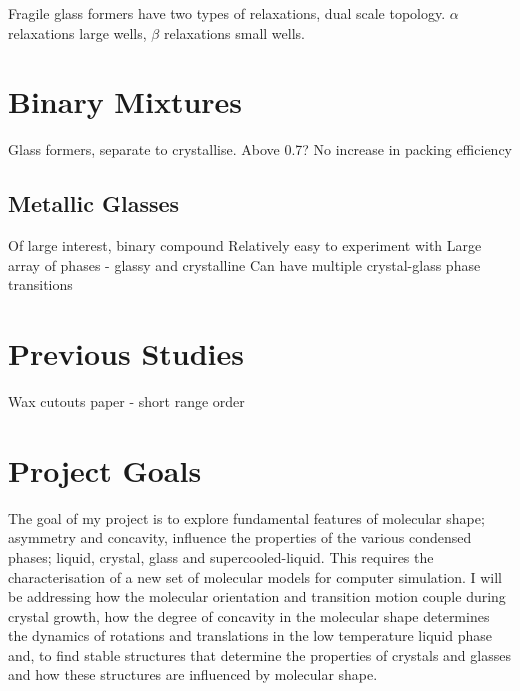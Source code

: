 \begin{figure}
\end{figure}

Fragile glass formers have two types of relaxations, dual scale topology. $\alpha$ relaxations large wells, $\beta$ relaxations small wells.~\cite{stillinger:95}

\section{Binary Mixtures}
Glass formers, separate to crystallise. Above 0.7? No increase in packing efficiency

\subsection{Metallic Glasses}
Of large interest, binary compound
Relatively easy to experiment with
Large array of phases - glassy and crystalline
Can have multiple crystal-glass phase transitions



\section{Previous Studies}
Wax cutouts paper - short range order

\section{Project Goals}

The goal of my project is to explore fundamental features of molecular shape; asymmetry and concavity, influence the properties of the various condensed phases; liquid, crystal, glass and supercooled-liquid. This requires the characterisation of a new set of molecular models for computer simulation. I will be addressing how the molecular orientation and transition motion couple during crystal growth, how the degree of concavity in the molecular shape determines the dynamics of rotations and translations in the low temperature liquid phase and, to find stable structures that determine the properties of crystals and glasses and how these structures are influenced by molecular shape.

